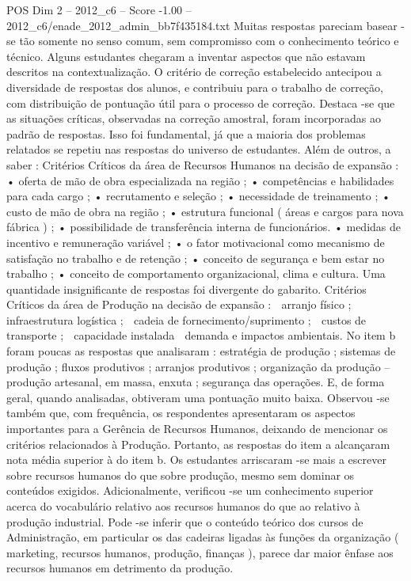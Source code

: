 \begin{textsample}{POS Dim 2 – 2012\_c6 – Score -1.00 – 2012\_c6/enade\_2012\_admin\_bb7f435184.txt}
Muitas respostas pareciam basear -se tão somente no senso comum, sem compromisso com o conhecimento teórico e técnico.
Alguns estudantes chegaram a inventar aspectos que não estavam descritos na contextualização.
O critério de correção estabelecido antecipou a diversidade de respostas dos alunos, e contribuiu para o trabalho de correção, com distribuição de pontuação útil para o processo de correção.
Destaca -se que as situações críticas, observadas na correção amostral, foram incorporadas ao padrão de respostas.
Isso foi fundamental, já que a maioria dos problemas relatados se repetiu nas respostas do universo de estudantes.
Além de outros, a saber : Critérios Críticos da área de Recursos Humanos na decisão de expansão : • oferta de mão de obra especializada na região ; • competências e habilidades para cada cargo ; • recrutamento e seleção ; • necessidade de treinamento ; • custo de mão de obra na região ; • estrutura funcional ( áreas e cargos para nova fábrica ) ; • possibilidade de transferência interna de funcionários. • medidas de incentivo e remuneração variável ; • o fator motivacional como mecanismo de satisfação no trabalho e de retenção ; • conceito de segurança e bem estar no trabalho ; • conceito de comportamento organizacional, clima e cultura.
Uma quantidade insignificante de respostas foi divergente do gabarito.
Critérios Críticos da área de Produção na decisão de expansão :  arranjo físico ;  infraestrutura logística ;  cadeia de fornecimento/suprimento ;  custos de transporte ;  capacidade instalada  demanda e impactos ambientais.
No item b foram poucas as respostas que analisaram : estratégia de produção ; sistemas de produção ; fluxos produtivos ; arranjos produtivos ; organização da produção – produção artesanal, em massa, enxuta ; segurança das operações.
E, de forma geral, quando analisadas, obtiveram uma pontuação muito baixa.
Observou -se também que, com frequência, os respondentes apresentaram os aspectos importantes para a Gerência de Recursos Humanos, deixando de mencionar os critérios relacionados à Produção.
Portanto, as respostas do item a alcançaram nota média superior à do item b.
Os estudantes arriscaram -se mais a escrever sobre recursos humanos do que sobre produção, mesmo sem dominar os conteúdos exigidos.
Adicionalmente, verificou -se um conhecimento superior acerca do vocabulário relativo aos recursos humanos do que ao relativo à produção industrial.
Pode -se inferir que o conteúdo teórico dos cursos de Administração, em particular os das cadeiras ligadas às funções da organização ( marketing, recursos humanos, produção, finanças ), parece dar maior ênfase aos recursos humanos em detrimento da produção.

\end{textsample}
